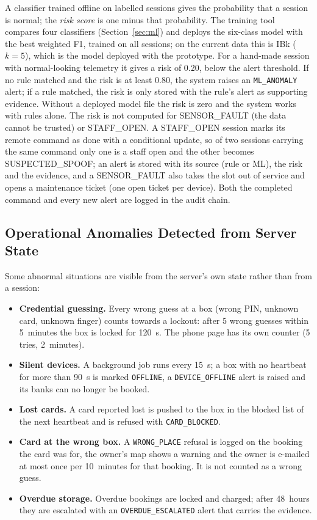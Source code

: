\documentclass[conference, onecolumn]{IEEEtran}
\begin{document}
A classifier trained offline on labelled sessions gives the probability that a session is normal; the \emph{risk
score} is one minus that probability. The training tool compares four classifiers (Section~\ref{sec:ml}) and deploys
the six-class model with the best weighted F1, trained on all sessions; on the current data this is IBk ($k=5$),
which is the model deployed with the prototype. For a hand-made session with normal-looking telemetry it gives a risk
of 0.20, below the alert threshold.
If no rule matched and the risk is at least 0.80, the system raises an \texttt{ML\_ANOMALY} alert; if a rule matched, the risk is only stored with the rule's alert as supporting evidence.
Without a deployed model file the risk is zero and the system works with rules alone. The risk is not computed for
SENSOR\_FAULT (the data cannot be trusted) or STAFF\_OPEN. A STAFF\_OPEN session marks its remote command as done with a conditional update, so of two sessions
carrying the same command only one is a staff open and the other becomes SUSPECTED\_SPOOF; an
alert is stored with its source (rule or ML), the risk and the evidence, and a SENSOR\_FAULT also takes the slot out of
service and opens a maintenance ticket (one open ticket per device). Both the completed command and every new alert are
logged in the audit chain.

\subsection{Operational Anomalies Detected from Server State}

Some abnormal situations are visible from the server's own state rather than from a session:
\begin{itemize}
  \item \textbf{Credential guessing.} Every wrong guess at a box (wrong PIN, unknown card, unknown finger) counts
        towards a lockout: after 5 wrong guesses within 5~minutes the box is locked for 120~s. The phone page has its own counter
        (5 tries, 2~minutes).
  \item \textbf{Silent devices.} A background job runs every 15~s; a box with no heartbeat for more than 90~s is marked
        \texttt{OFFLINE}, a \texttt{DEVICE\_OFFLINE} alert is raised and its banks can no longer be booked.
  \item \textbf{Lost cards.} A card reported lost is pushed to the box in the blocked list of the next heartbeat and is
        refused with \texttt{CARD\_BLOCKED}.
  \item \textbf{Card at the wrong box.} A \texttt{WRONG\_PLACE} refusal is logged on the booking the card was for, the
        owner's map shows a warning and the owner is e-mailed at most once per 10~minutes for that booking. It is not
        counted as a wrong guess.
  \item \textbf{Overdue storage.} Overdue bookings are locked and charged; after 48~hours they are escalated with an
        \texttt{OVERDUE\_ESCALATED} alert that carries the evidence.
\end{itemize}
\end{document}
